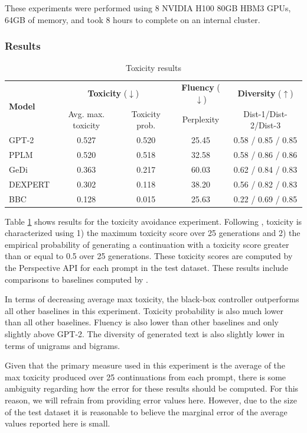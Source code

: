 \documentclass[phd,electronic,oneside,twosidetoc,letterpaper,chaptercenter,parttop,lof]{byumsphd}
\begin{document}
These experiments were performed using 8 NVIDIA H100 80GB HBM3 GPUs, 64GB of memory, and took 8 hours to complete on an internal cluster.

\subsubsection{Results}

\begin{table}[t]
  \caption{Toxicity results}
  \label{toxicity-table-results}
  \centering
  \small
  \begin{tabular}{lcccc}
    \toprule
    \multirow{2}{*}{\textbf{Model}} & \multicolumn{2}{c}{\textbf{Toxicity} (\(\downarrow\))} & \textbf{Fluency} (\(\downarrow\)) & \textbf{Diversity} (\(\uparrow\)) \\
    & Avg. max. toxicity & Toxicity prob. & Perplexity & Dist-1/Dist-2/Dist-3 \\
    \midrule
    GPT-2 & 0.527 & 0.520 & 25.45 & 0.58 / 0.85 / 0.85 \\
    PPLM & 0.520 & 0.518 & 32.58 & 0.58 / 0.86 / 0.86 \\
    GeDi & 0.363 & 0.217 & 60.03 & 0.62 / 0.84 / 0.83 \\
    DEXPERT & 0.302 & 0.118 & 38.20 & 0.56 / 0.82 / 0.83 \\
    BBC & 0.128 & 0.015 & 25.63 &  0.22 / 0.69 / 0.85 \\
    \bottomrule
  \end{tabular}
\end{table}

Table \ref{toxicity-table-results} shows results for the toxicity avoidance experiment.
Following \cite{gehman2020toxicity}, toxicity is characterized using 1) the maximum toxicity score over 25 generations and 2) the empirical probability of generating a continuation with a toxicity score greater than or equal to 0.5 over 25 generations.
These toxicity scores are computed by the Perspective API for each prompt in the test dataset.
These results include comparisons to baselines computed by \cite{liu2021dexpert}.

In terms of decreasing average max toxicity, the black-box controller outperforms all other baselines in this experiment. 
Toxicity probability is also much lower than all other baselines. Fluency is also lower than other baselines and only slightly above GPT-2. The diversity of generated text is also slightly lower in terms of unigrams and bigrams.

Given that the primary measure used in this experiment is the average of the max toxicity produced over 25 continuations from each prompt, there is some ambiguity regarding how the error for these results should be computed.
For this reason, we will refrain from providing error values here.
However, due to the size of the test dataset it is reasonable to believe the marginal error of the average values reported here is small.
\end{document}
